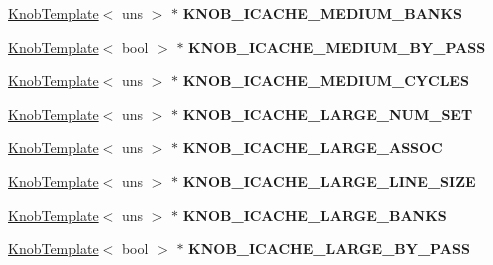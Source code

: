 \begin{DoxyCompactItemize}
\item 
\hypertarget{classall__knobs__c_a836ab50f952fa7faa2fd50cb8b475dba}{
\hyperlink{classKnobTemplate}{KnobTemplate}$<$ uns $>$ $\ast$ {\bfseries KNOB\_\-ICACHE\_\-MEDIUM\_\-BANKS}}
\label{classall__knobs__c_a836ab50f952fa7faa2fd50cb8b475dba}

\item 
\hypertarget{classall__knobs__c_a0fd10ba14178e63b6e245d8ae9ea0d90}{
\hyperlink{classKnobTemplate}{KnobTemplate}$<$ bool $>$ $\ast$ {\bfseries KNOB\_\-ICACHE\_\-MEDIUM\_\-BY\_\-PASS}}
\label{classall__knobs__c_a0fd10ba14178e63b6e245d8ae9ea0d90}

\item 
\hypertarget{classall__knobs__c_aef27c2bf434eef54049f97ba78230740}{
\hyperlink{classKnobTemplate}{KnobTemplate}$<$ uns $>$ $\ast$ {\bfseries KNOB\_\-ICACHE\_\-MEDIUM\_\-CYCLES}}
\label{classall__knobs__c_aef27c2bf434eef54049f97ba78230740}

\item 
\hypertarget{classall__knobs__c_a69b930913a3369bb729c8e09747350fa}{
\hyperlink{classKnobTemplate}{KnobTemplate}$<$ uns $>$ $\ast$ {\bfseries KNOB\_\-ICACHE\_\-LARGE\_\-NUM\_\-SET}}
\label{classall__knobs__c_a69b930913a3369bb729c8e09747350fa}

\item 
\hypertarget{classall__knobs__c_a73af5e39fc9ab75bc13d52c770d600a2}{
\hyperlink{classKnobTemplate}{KnobTemplate}$<$ uns $>$ $\ast$ {\bfseries KNOB\_\-ICACHE\_\-LARGE\_\-ASSOC}}
\label{classall__knobs__c_a73af5e39fc9ab75bc13d52c770d600a2}

\item 
\hypertarget{classall__knobs__c_a960cc82fea89f8296552b7fde9eb1326}{
\hyperlink{classKnobTemplate}{KnobTemplate}$<$ uns $>$ $\ast$ {\bfseries KNOB\_\-ICACHE\_\-LARGE\_\-LINE\_\-SIZE}}
\label{classall__knobs__c_a960cc82fea89f8296552b7fde9eb1326}

\item 
\hypertarget{classall__knobs__c_ae6097bb6034e992ded8f7d22f0f757af}{
\hyperlink{classKnobTemplate}{KnobTemplate}$<$ uns $>$ $\ast$ {\bfseries KNOB\_\-ICACHE\_\-LARGE\_\-BANKS}}
\label{classall__knobs__c_ae6097bb6034e992ded8f7d22f0f757af}

\item 
\hypertarget{classall__knobs__c_a42704cd951c7e66b0e13f5781e65a79c}{
\hyperlink{classKnobTemplate}{KnobTemplate}$<$ bool $>$ $\ast$ {\bfseries KNOB\_\-ICACHE\_\-LARGE\_\-BY\_\-PASS}}
\label{classall__knobs__c_a42704cd951c7e66b0e13f5781e65a79c}


\end{DoxyCompactItemize}
